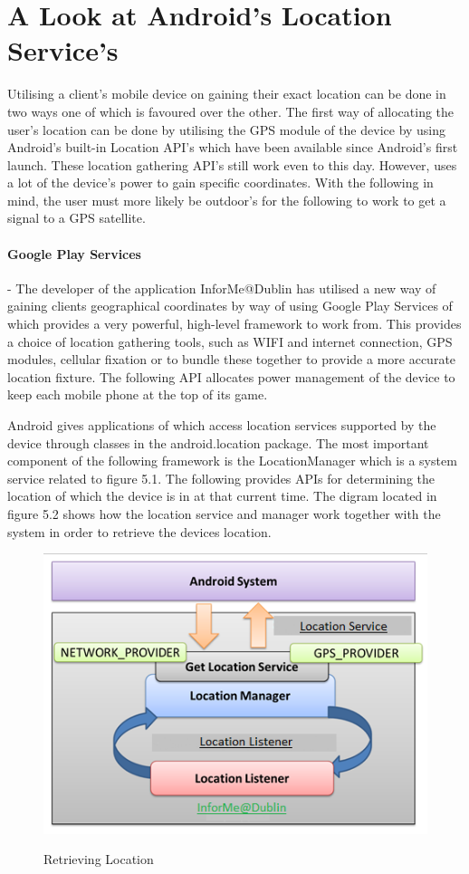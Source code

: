 \section{A Look at Android's Location Service's}
Utilising a client's mobile device on gaining their exact location can be done in two ways one of which is favoured over the other. The first way of allocating the user's location can be done by utilising the GPS module of the device by using Android's built-in Location API's which have been available since Android's first launch. These location gathering API's still work even to this day. However, uses a lot of the device's power to gain specific coordinates. With the following in mind, the user must more likely be outdoor's for the following to work to get a signal to a GPS satellite.

\paragraph{Google Play Services} -
The developer of the application InforMe@Dublin has utilised a new way of gaining clients geographical coordinates by way of using Google Play Services of which provides a very powerful, high-level framework to work from. This provides a choice of location gathering tools, such as WIFI and internet connection, GPS modules, cellular fixation or to bundle these together to provide a more accurate location fixture. The following API allocates power management of the device to keep each mobile phone at the top of its game.
\par
Android gives applications of which access location services supported by the device through classes in the android.location package. The most important component of the following framework is the LocationManager which is a system service related to figure 5.1. The following provides APIs for determining the location of which the device is in at that current time. The digram located in figure 5.2 shows how the location service and manager work together with the system in order to retrieve the devices location.

\begin{figure}[htbp]
	\center \includegraphics[width=400pt]{locationManager}\\
	\caption{Retrieving Location} \label{Figure: Retrieving Location}
\end{figure}


